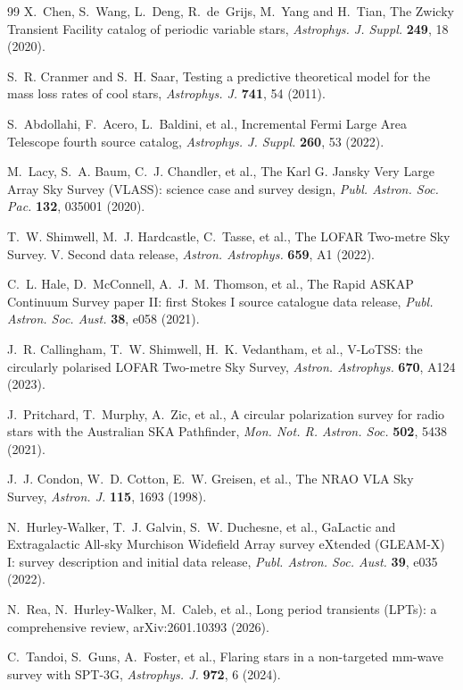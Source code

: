 \documentclass[3p,11pt]{elsarticle}
\begin{document}
\begin{thebibliography}{99}
X.~Chen, S.~Wang, L.~Deng, R.~de~Grijs, M.~Yang and H.~Tian, The Zwicky Transient Facility
catalog of periodic variable stars, \emph{Astrophys. J. Suppl.} \textbf{249}, 18 (2020).

S.~R. Cranmer and S.~H. Saar, Testing a predictive theoretical model for the mass loss
rates of cool stars, \emph{Astrophys. J.} \textbf{741}, 54 (2011).

S.~Abdollahi, F.~Acero, L.~Baldini, et al., Incremental Fermi Large Area Telescope fourth
source catalog, \emph{Astrophys. J. Suppl.} \textbf{260}, 53 (2022).

M.~Lacy, S.~A. Baum, C.~J. Chandler, et al., The Karl G. Jansky Very Large Array Sky
Survey (VLASS): science case and survey design, \emph{Publ. Astron. Soc. Pac.}
\textbf{132}, 035001 (2020).

T.~W. Shimwell, M.~J. Hardcastle, C.~Tasse, et al., The LOFAR Two-metre Sky Survey. V.
Second data release, \emph{Astron. Astrophys.} \textbf{659}, A1 (2022).

C.~L. Hale, D.~McConnell, A.~J.~M. Thomson, et al., The Rapid ASKAP Continuum Survey
paper II: first Stokes I source catalogue data release, \emph{Publ. Astron. Soc. Aust.}
\textbf{38}, e058 (2021).

J.~R. Callingham, T.~W. Shimwell, H.~K. Vedantham, et al., V-LoTSS: the circularly
polarised LOFAR Two-metre Sky Survey, \emph{Astron. Astrophys.} \textbf{670}, A124 (2023).

J.~Pritchard, T.~Murphy, A.~Zic, et al., A circular polarization survey for radio stars
with the Australian SKA Pathfinder, \emph{Mon. Not. R. Astron. Soc.} \textbf{502}, 5438
(2021).

J.~J. Condon, W.~D. Cotton, E.~W. Greisen, et al., The NRAO VLA Sky Survey, \emph{Astron.
J.} \textbf{115}, 1693 (1998).

N.~Hurley-Walker, T.~J. Galvin, S.~W. Duchesne, et al., GaLactic and Extragalactic All-sky
Murchison Widefield Array survey eXtended (GLEAM-X) I: survey description and initial
data release, \emph{Publ. Astron. Soc. Aust.} \textbf{39}, e035 (2022).

N.~Rea, N.~Hurley-Walker, M.~Caleb, et al., Long period transients (LPTs): a comprehensive
review, arXiv:2601.10393 (2026).

C.~Tandoi, S.~Guns, A.~Foster, et al., Flaring stars in a non-targeted mm-wave survey with
SPT-3G, \emph{Astrophys. J.} \textbf{972}, 6 (2024).


\end{thebibliography}
\end{document}
